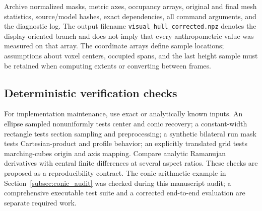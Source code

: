 Archive normalized masks, metric axes, occupancy arrays, original and final mesh statistics, source/model hashes, exact dependencies, all command arguments, and the diagnostic log. The output filename \texttt{visual\_hull\_corrected.npz} denotes the display-oriented branch and does not imply that every anthropometric value was measured on that array. The coordinate arrays define sample locations; assumptions about voxel centers, occupied spans, and the last height sample must be retained when computing extents or converting between frames.

\subsection{Deterministic verification checks}
For implementation maintenance, use exact or analytically known inputs. An ellipse sampled nonuniformly tests center and conic recovery; a constant-width rectangle tests section sampling and preprocessing; a synthetic bilateral run mask tests Cartesian-product and profile behavior; an explicitly translated grid tests marching-cubes origin and axis mapping. Compare analytic Ramanujan derivatives with central finite differences at several aspect ratios. These checks are proposed as a reproducibility contract. The conic arithmetic example in Section~\ref{subsec:conic_audit} was checked during this manuscript audit; a comprehensive executable test suite and a corrected end-to-end evaluation are separate required work.

